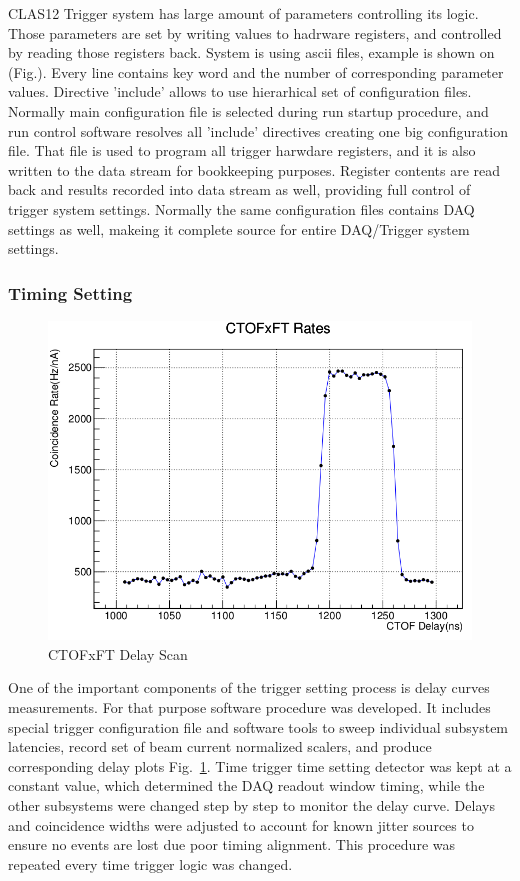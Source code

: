 CLAS12 Trigger system has large amount of parameters controlling its logic. Those parameters are set by writing values to hadrware registers, and controlled by reading those registers back. System is using ascii files, example is shown on (Fig.). Every line contains key word and the number of corresponding parameter values. Directive 'include' allows to use hierarhical set of configuration files. Normally main configuration file is selected during run startup procedure, and run control software resolves all 'include' directives creating one big configuration file. That file is used to program all trigger harwdare registers, and it is also written to the data stream for bookkeeping purposes. Register contents are read back and results recorded into data stream as well, providing full control of trigger system settings. Normally the same configuration files contains DAQ settings as well, makeing it complete source for entire DAQ/Trigger system settings.


\subsubsection{Timing Setting}

\begin{figure}[hbt]
	\centering
	\includegraphics[width=1.0\columnwidth,keepaspectratio]{img/delay_scan_ctof_ft.png}
	\caption{CTOFxFT Delay Scan}
	\label{fig:delay_scan_ctof_ft}
\end{figure}

One of the important components of the trigger setting process is delay curves measurements. For that purpose software procedure was developed. It includes special trigger configuration file and software tools to sweep individual subsystem latencies, record set of beam current normalized scalers, and produce corresponding delay plots Fig.~\ref{fig:delay_scan_ctof_ft}. Time trigger time setting detector was kept at a constant value, which determined the DAQ readout window timing, while the other subsystems were changed step by step to monitor the delay curve. Delays and coincidence widths were adjusted to account for known jitter sources to ensure no events are lost due poor timing alignment. This procedure was repeated every time trigger logic was changed.


